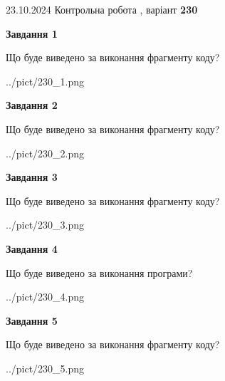 \documentclass[12pt, ukrainian]{article}
\begin{document}
{\Large{23.10.2024 Контрольна робота , варіант  \No \textbf { 230 }\par}}
{
\begin {large}
{\begin {center}\textbf{Завдання 1}\end {center}}

Що буде виведено за виконання фрагменту коду?\par
\begin{center}
	{../pict/230_1.png}
\end{center}
\newpage

{\begin {center}\textbf{Завдання 2}\end {center}}

Що буде виведено за виконання фрагменту коду?\par
\begin{center}
	{../pict/230_2.png}
\end{center}
\newpage

{\begin {center}\textbf{Завдання 3}\end {center}}

Що буде виведено за виконання фрагменту коду?\par
\begin{center}
	{../pict/230_3.png}
\end{center}
\newpage

{\begin {center}\textbf{Завдання 4}\end {center}}

Що буде виведено за виконання програми?\par
\begin{center}
	{../pict/230_4.png}
\end{center}
\newpage

{\begin {center}\textbf{Завдання 5}\end {center}}

Що буде виведено за виконання фрагменту коду?\par
\begin{center}
	{../pict/230_5.png}
\end{center}
\newpage


\end{large}}
\end{document}
